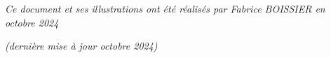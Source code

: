 \documentclass[11pt,a4paper]{article}
\begin{document}
{\begin{tabular}{ | c c c | C{4cm} | C{2cm} | }
\end{tabular}
}

\vfillLast

\bigskip


%
%

\begin{center}
\textit{Ce document et ses illustrations ont été réalisés par Fabrice BOISSIER en octobre 2024}

\textit{(dernière mise à jour octobre 2024)}
\end{center}
\end{document}
